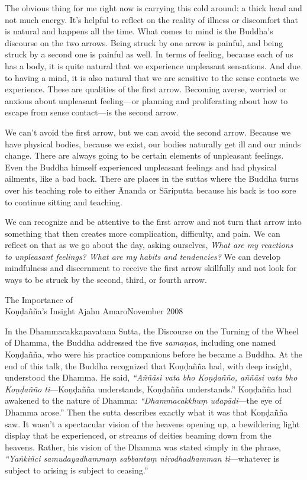 
The obvious thing for me right now is carrying this cold around: a 
thick head and not much energy. It's helpful to reflect on the reality 
of illness or discomfort that is natural and happens all the time. What 
comes to mind is the Buddha's discourse on the two arrows. Being struck 
by one arrow is painful, and being struck by a second one is painful as 
well. In terms of feeling, because each of us has a body, it is quite 
natural that we experience unpleasant sensations. And due to having a 
mind, it is also natural that we are sensitive to the sense contacts we 
experience. These are qualities of the first arrow. Becoming averse, 
worried or anxious about unpleasant feeling---or planning and 
proliferating about how to escape from sense contact---is the second 
arrow.

We can't avoid the first arrow, but we can avoid the second arrow. 
Because we have physical bodies, because we exist, our bodies naturally 
get ill and our minds change. There are always going to be certain 
elements of unpleasant feelings. Even the Buddha himself experienced 
unpleasant feelings and had physical ailments, like a bad back. There 
are places in the suttas where the Buddha turns over his teaching role 
to either Ānanda or Sāriputta because his back is too sore to 
continue sitting and teaching.

We can recognize and be attentive to the first arrow and not turn that 
arrow into something that then creates more complication, difficulty, 
and pain. We can reflect on that as we go about the day, asking 
ourselves, \emph{What are my reactions to unpleasant feelings? What are 
my habits and tendencies?} We can develop mindfulness and discernment 
to receive the first arrow skillfully and not look for ways to be 
struck by the second, third, or fourth arrow.

{The Importance of\\Koṇḍañña's Insight}
{Ajahn Amaro}{November 2008}

In the Dhammacakkapavatana Sutta, the Discourse on the Turning of the 
Wheel of Dhamma, the Buddha addressed the five \emph{samaṇas}, 
including one named Koṇḍañña, who were his practice companions 
before he became a Buddha. At the end of this talk, the Buddha 
recognized that Koṇḍañña had, with deep insight, understood the 
Dhamma. He said, \emph{``Aññāsi vata bho Koṇḍañño, aññāsi 
vata bho Koṇḍañño ti}---Koṇḍañña understands, 
Koṇḍañña understands.'' Koṇḍañña had awakened to the nature 
of Dhamma: \emph{``Dhammacakkhuṃ udapādi}---the eye of Dhamma 
arose.'' Then the sutta describes exactly what it was that 
Koṇḍañña saw. It wasn't a spectacular vision of the heavens 
opening up, a bewildering light display that he experienced, or streams 
of deities beaming down from the heavens. Rather, his vision of the 
Dhamma was stated simply in the phrase, \emph{``Yaṅkiñci 
samudayadhammaṃ sabbantaṃ nirodhadhamman ti}---whatever is subject 
to arising is subject to ceasing.''


